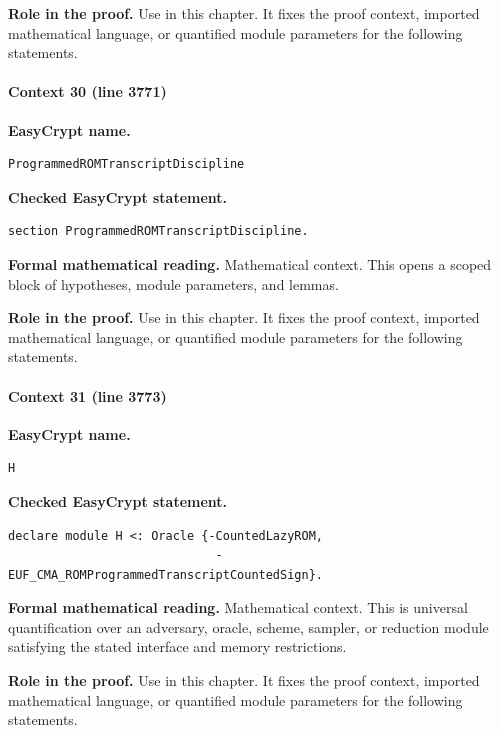 \noindent\textbf{Role in the proof.}
Use in this chapter. It fixes the proof context, imported mathematical language, or quantified module parameters for the following statements.

\paragraph{Context 30 (line 3771)}
\noindent\textbf{EasyCrypt name.}
\begin{lstlisting}[language=EasyCrypt,basicstyle=\ttfamily\scriptsize]
ProgrammedROMTranscriptDiscipline
\end{lstlisting}
\noindent\textbf{Checked EasyCrypt statement.}
\begin{lstlisting}[language=EasyCrypt,basicstyle=\ttfamily\scriptsize]
section ProgrammedROMTranscriptDiscipline.
\end{lstlisting}
\noindent\textbf{Formal mathematical reading.}
Mathematical context. This opens a scoped block of hypotheses, module parameters, and lemmas.

\noindent\textbf{Role in the proof.}
Use in this chapter. It fixes the proof context, imported mathematical language, or quantified module parameters for the following statements.

\paragraph{Context 31 (line 3773)}
\noindent\textbf{EasyCrypt name.}
\begin{lstlisting}[language=EasyCrypt,basicstyle=\ttfamily\scriptsize]
H
\end{lstlisting}
\noindent\textbf{Checked EasyCrypt statement.}
\begin{lstlisting}[language=EasyCrypt,basicstyle=\ttfamily\scriptsize]
declare module H <: Oracle {-CountedLazyROM,
                             -EUF_CMA_ROMProgrammedTranscriptCountedSign}.
\end{lstlisting}
\noindent\textbf{Formal mathematical reading.}
Mathematical context. This is universal quantification over an adversary, oracle, scheme, sampler, or reduction module satisfying the stated interface and memory restrictions.

\noindent\textbf{Role in the proof.}
Use in this chapter. It fixes the proof context, imported mathematical language, or quantified module parameters for the following statements.

